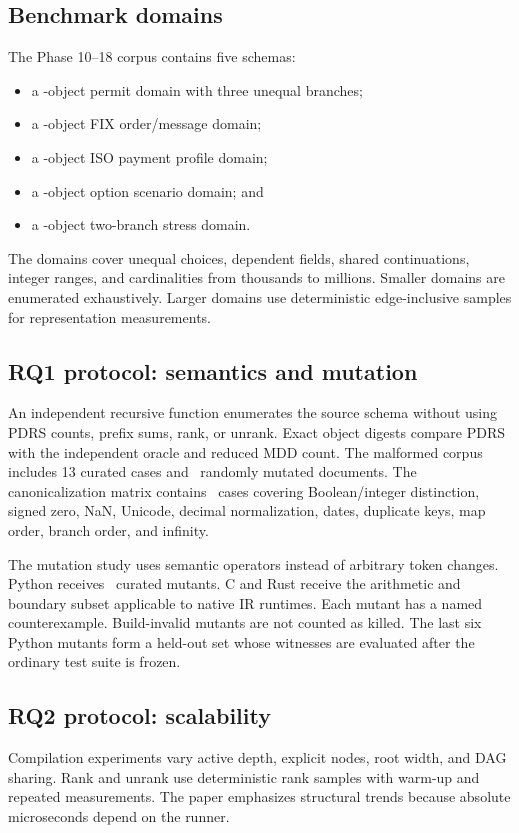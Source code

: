 \subsection{Benchmark domains}
The Phase 10--18 corpus contains five schemas:
\begin{itemize}
  \item a \PermitDomain-object permit domain with three unequal branches;
  \item a \FixDomain-object FIX order/message domain;
  \item a \IsoDomain-object ISO payment profile domain;
  \item a \QuantDomain-object option scenario domain; and
  \item a \ImbalancedDomain-object two-branch stress domain.
\end{itemize}
The domains cover unequal choices, dependent fields, shared continuations, integer ranges, and cardinalities from thousands to millions. Smaller domains are enumerated exhaustively. Larger domains use deterministic edge-inclusive samples for representation measurements.

\subsection{RQ1 protocol: semantics and mutation}
An independent recursive function enumerates the source schema without using PDRS counts, prefix sums, rank, or unrank. Exact object digests compare PDRS with the independent oracle and reduced MDD count. The malformed corpus includes 13 curated cases and \MalformedFuzz\ randomly mutated documents. The canonicalization matrix contains \CanonicalCases\ cases covering Boolean/integer distinction, signed zero, NaN, Unicode, decimal normalization, dates, duplicate keys, map order, branch order, and infinity.

The mutation study uses semantic operators instead of arbitrary token changes. Python receives \PythonMutants\ curated mutants. C and Rust receive the arithmetic and boundary subset applicable to native IR runtimes. Each mutant has a named counterexample. Build-invalid mutants are not counted as killed. The last six Python mutants form a held-out set whose witnesses are evaluated after the ordinary test suite is frozen.

\subsection{RQ2 protocol: scalability}
Compilation experiments vary active depth, explicit nodes, root width, and DAG sharing. Rank and unrank use deterministic rank samples with warm-up and repeated measurements. The paper emphasizes structural trends because absolute microseconds depend on the runner.

